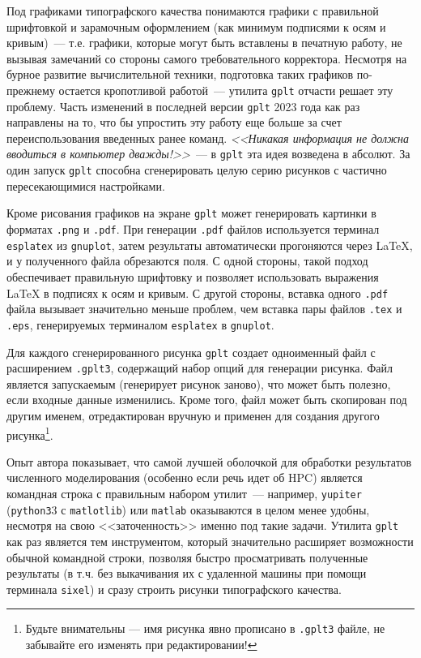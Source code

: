\documentclass[12pt]{article}
\def\gplt{{\tt gplt}}
\def\gnuplot{{\tt gnuplot}}
\def\python{{\tt python3}}
\def\png{{\tt .png}}
\def\pdf{{\tt .pdf}}
\begin{document}
Под графиками типографского качества понимаются графики с правильной шрифтовкой и зарамочным оформлением (как минимум подписями к осям и кривым)~---
т.е. графики, которые могут быть вставлены в печатную
работу, не вызывая замечаний со стороны самого требовательного корректора. Несмотря на бурное развитие вычислительной техники, подготовка таких графиков по-прежнему
остается кропотливой работой~--- утилита \gplt{} отчасти решает эту проблему.
Часть изменений в последней версии \gplt{} 2023 года как раз направлены на то, что бы упростить эту работу
еще больше за счет переиспользования введенных ранее команд. {\it<<Никакая информация не должна вводиться в компьютер дважды!>>}~--- в \gplt{} эта идея возведена в абсолют.
За один запуск \gplt{} способна сгенерировать целую серию рисунков с частично пересекающимися настройками.

Кроме рисования графиков на экране \gplt{} может генерировать картинки в форматах \png{} и \pdf.  При генерации \pdf{}  файлов используется терминал {\tt esplatex}
из \gnuplot, затем результаты автоматически прогоняются через \LaTeX{}, и у полученного файла обрезаются поля. С одной стороны, такой подход обеспечивает правильную
шрифтовку и позволяет использовать выражения \LaTeX{} в подписях к осям и кривым. С другой стороны, вставка одного \pdf{} файла вызывает
значительно меньше проблем, чем вставка пары файлов \verb'.tex' и \verb'.eps', генерируемых терминалом {\tt esplatex} в \gnuplot.

Для каждого сгенерированного рисунка \gplt{} создает одноименный  файл с расширением \verb'.gplt3', содержащий набор опций для генерации рисунка.
Файл является запускаемым (генерирует рисунок заново), что может быть полезно, если входные данные изменились.
Кроме того, файл может быть скопирован под другим именем, отредактирован вручную и применен для создания другого рисунка\footnote{Будьте внимательны ---
  имя рисунка явно прописано в {\tt .gplt3} файле, не забывайте его изменять при редактировании!}.

Опыт автора показывает, что самой лучшей оболочкой для обработки результатов численного моделирования (особенно если речь идет об HPC) является командная строка
с правильным набором утилит~--- например, \verb'yupiter' (\python3 с \verb'matlotlib') или \verb'matlab' оказываются в целом менее удобны, несмотря на свою <<заточенность>>
именно под такие задачи. Утилита   \gplt{} как раз является тем инструментом, который значительно расширяет возможности обычной командной строки,
позволяя быстро просматривать полученные результаты (в т.ч. без выкачивания их с удаленной машины при помощи терминала \verb'sixel')
и сразу строить рисунки типографского качества. 
\end{document}
